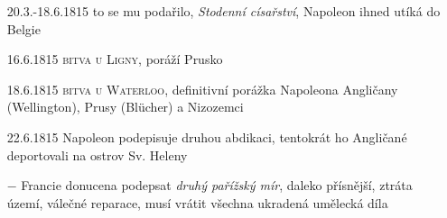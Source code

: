 \documentclass{article}
\begin{document}
\begin{itemize}
    \item[20.3.-18.6.1815] to se mu podařilo, \textit{Stodenní císařství}, Napoleon ihned utíká do Belgie
    \item[16.6.1815] \textsc{bitva u Ligny}, poráží Prusko
    \item[18.6.1815]  \textsc{bitva u Waterloo}, definitivní porážka Napoleona Angličany (Wellington), Prusy (Blücher) a Nizozemci
    \item[22.6.1815] Napoleon podepisuje druhou abdikaci, tentokrát ho Angličané deportovali na ostrov Sv. Heleny
    \item[$-$] Francie donucena podepsat \textit{druhý pařížský mír}, daleko přísnější, ztráta území, válečné reparace, musí vrátit všechna ukradená umělecká díla
\end{itemize}
\end{document}
